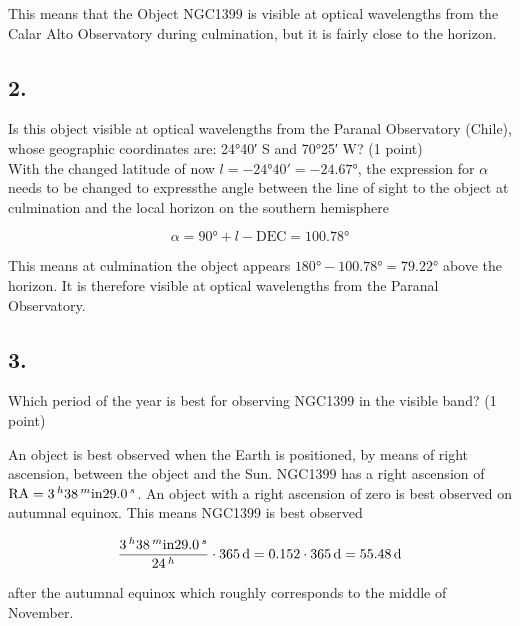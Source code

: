 \documentclass[11pt,a4paper,twoside]{article}
\begin{document}
This means that the Object NGC1399 is visible at optical wavelengths from the Calar Alto Observatory during culmination, but it is fairly close to the horizon. \\

\subsection*{2.}  Is this object visible at optical wavelengths from the Paranal Observatory (Chile), whose geographic coordinates are: \ang{24;40;} S and \ang{70;25;} W? (1 point) \\

With the changed latitude of now $l = -\ang{24;40;} = -\ang{24.67}$, the expression for $\alpha$ needs to be changed to expressthe angle between the line of sight to the object at culmination and the local horizon on the southern hemisphere

\begin{equation}
 \alpha = \ang{90} + l - \text{DEC} = \ang{100.78}
\end{equation}

This means at culmination the object appears $\ang{180} - \ang{100.78} = \ang{79.22}$ above the horizon. It is therefore visible at optical wavelengths from the Paranal Observatory. \\

\subsection*{3.} Which period of the year is best for observing NGC1399 in the visible band? (1 point)

An object is best observed when the Earth is positioned, by means of right ascension, between the object and the Sun. NGC1399 has a right ascension of $\text{RA} = \SI{03}{^\hour} \SI{38}{^\minute} \SI{29.0}{^\second}$. An object with a right ascension of zero is best observed on autumnal equinox. This means NGC1399 is best observed 

\begin{equation}
 \frac{\SI{3}{^\hour} \SI{38}{^\minute} \SI{29.0}{^\second}}{\SI{24}{^\hour}} \cdot \SI{365}{\day} = 0.152 \cdot \SI{365}{\day} = \SI{55.48}{\day}
\end{equation}

after the autumnal equinox which roughly corresponds to the middle of November. \\
\end{document}
